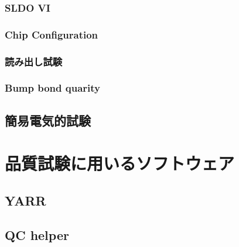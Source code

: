 \subsubsection{SLDO VI}

\subsubsection{Chip Configuration}

\subsubsection{読み出し試験}

\subsubsection{Bump bond quarity}

\subsection{簡易電気的試験}
\subsubsection{}



\section{品質試験に用いるソフトウェア}
\subsection{YARR}
\subsection{QC helper}



